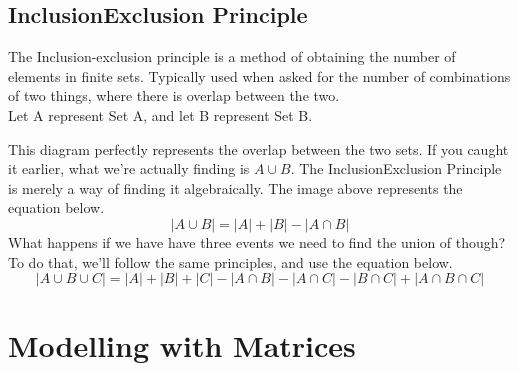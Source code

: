 \documentclass[final,1p,12pt]{elsarticle}
\begin{document}
    \subsection{Inclusion\textemdash Exclusion Principle}
    The Inclusion-exclusion principle is a method of obtaining the number of elements in finite sets.
    Typically used when asked for the number of combinations of two things, where there is overlap between the two.\\
    Let A represent Set A, and let B represent Set B.
    \begin{center}
    \end{center}
    This diagram perfectly represents the overlap between the two sets.
    If you caught it earlier, what we're actually finding is $A\cup B$.
    The Inclusion\textemdash Exclusion Principle is merely a way of finding it algebraically.
    The image above represents the equation below.
    \begin{equation*}
        |A\cup B| = |A| + |B| - |A\cap B|
    \end{equation*}
    What happens if we have have three events we need to find the union of though?
    To do that, we'll follow the same principles, and use the equation below.
    \begin{equation*}
        |A\cup B\cup C| = |A| + |B| + |C| - |A\cap B| - |A\cap C| - |B\cap C| + |A\cap B\cap C|
    \end{equation*}
    
\section{Modelling with Matrices}
    
\end{document}
